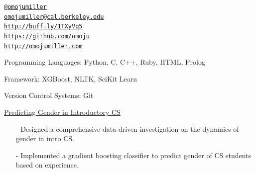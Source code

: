 \documentclass[11pt,article,oneside]{memoir}
\makeatletter
\def\myemail{omojumiller@cal.berkeley.edu}
\def\myweb{http://omojumiller.com}
\def\mytwitter{@omojumiller}
\def\mylinkedin{http://buff.ly/1TXyVq5}
\def\mygithub{https://github.com/omoju}
\makeatother
\begin{document}
\begin{minipage}[t]{2.95in}
  
\end{minipage}
\hfill     
\hfill
\begin{minipage}[t]{1.6in}
  \flushright \footnotesize  \addressblock 
  {\scriptsize  \texttt{\href{http://twitter.com/omojumiller}{\mytwitter}} \, \faTwitter }  \\ 
  {\scriptsize  \texttt{\href{mailto:\myemail}{\myemail}} \, \faEnvelope} \\
  {\scriptsize  \texttt{\href{\mylinkedin}{\mylinkedin}} \, \faLinkedin} \\
  {\scriptsize  \texttt{\href{\mygithub}{\mygithub}} \, \faGithub} \\
  {\scriptsize  \texttt{\href{\myweb}{\myweb}} \, \faGlobe}
\end{minipage}

\medskip


\bigskip       
{}
\reversemarginpar

\medskip

\ind Programming Languages: Python, C, C++, Ruby, HTML, Prolog

\ind Framework: XGBoost, NLTK, SciKit Learn

\ind Version Control Systems: Git
\bigskip 

\medskip

\ind \href{https://github.com/omoju/genderCSExperience}{Predicting Gender in Introductory CS}
\begin{itemize}[noitemsep,nolistsep]
\item[-] Designed a comprehensive data-driven investigation on the dynamics of gender in intro CS. 
\item[-] Implemented a gradient boosting classifier to predict gender of CS students based on experience.
\end{itemize}
\end{document}

